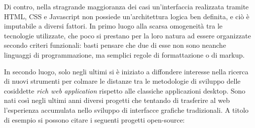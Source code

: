 Di contro, nella stragrande maggioranza dei casi un'interfaccia realizzata tramite HTML, CSS e Javascript non possiede un'architettura logica ben definita, e ciò è imputabile a diversi fattori. 
In primo luogo alla scarsa omogeneità tra le tecnologie utilizzate, che poco si prestano per la loro natura ad essere organizzate secondo criteri funzionali: basti pensare che due di esse non sono neanche linguaggi di programmazione, ma semplici regole di formattazione o di markup. 

In secondo luogo, solo negli ultimi si è iniziato a diffondere interesse nella ricerca di nuovi strumenti per colmare le distanze tra le metodologie di sviluppo delle cosiddette \emph{rich web application} rispetto alle classiche applicazioni desktop. Sono nati così negli ultimi anni diversi progetti che tentando di trasferire al web l'esperienza accumulata nello sviluppo di interfacce grafiche tradizionali. A titolo di esempio si possono citare i seguenti progetti open-source:

